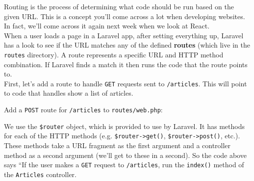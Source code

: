 Routing is the process of determining what code should be run based on the given URL. This is a concept you'll come across a lot when developing websites. In fact, we'll come across it again next week when we look at React.
\\

When a user loads a page in a Laravel app, after setting everything up, Laravel has a look to see if the URL matches any of the defined \textbf{routes} (which live in the \texttt{routes} directory). A route represents a specific URL and HTTP method combination. If Laravel finds a match it then runs the code that the route points to.
\\

First, let's add a route to handle \texttt{GET} requests sent to \texttt{/articles}. This will point to code that handles show a list of articles.

\pagebreak

Add a \texttt{POST} route for \texttt{/articles} to \texttt{routes/web.php}:


We use the \texttt{\$router} object, which is provided to use by Laravel. It has methods for each of the HTTP methods (e.g. \texttt{\$router->get()}, \texttt{\$router->post()}, etc.). These methods take a URL fragment as the first argument and a controller  method as a second argument (we'll get to these in a second). So the code above says ``If the user makes a \texttt{GET} request to \texttt{/articles}, run the \texttt{index()} method of the \texttt{Articles} controller.
